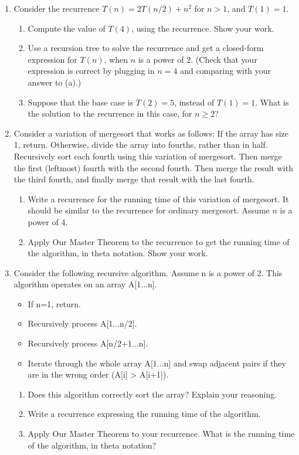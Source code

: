 \documentclass{article}
\begin{document}
\begin{enumerate}
    \item Consider the recurrence $T(n) = 2T(n/2) + n^2$ for $n > 1$, and $T(1) = 1$.
    \begin{enumerate}
        \item Compute the value of $T(4)$, using the recurrence. Show your work.
        \item Use a recursion tree to solve the recurrence and get a closed-form expression for $T(n)$, when $n$ is a power of 2. (Check that your expression is correct by plugging in $n = 4$ and comparing with your answer to (a).)
        \item Suppose that the base case is $T(2) = 5$, instead of $T(1) = 1$. What is the solution to the recurrence in this case, for $n \ge 2$?
    \end{enumerate}

    \item Consider a variation of mergesort that works as follows: If the array has size 1, return. Otherwise, divide the array into fourths, rather than in half. Recursively sort each fourth using this variation of mergesort. Then merge the first (leftmost) fourth with the second fourth. Then merge the result with the third fourth, and finally merge that result with the last fourth.
    \begin{enumerate}
        \item Write a recurrence for the running time of this variation of mergesort. It should be similar to the recurrence for ordinary mergesort. Assume $n$ is a power of 4.
        \item Apply Our Master Theorem to the recurrence to get the running time of the algorithm, in theta notation. Show your work.
    \end{enumerate}

    \item Consider the following recursive algorithm. Assume n is a power of 2.  This algorithm operates on an array A[1...n].
    \begin{itemize}
        \item If n=1, return.
        \item Recursively process A[1...n/2].
        \item Recursively process A[n/2+1...n].
        \item Iterate through the whole array A[1...n] and swap adjacent pairs if they are in the wrong order (A[i] > A[i+1]).
    \end{itemize}
    \begin{enumerate}
        \item  Does this algorithm correctly sort the array? Explain your reasoning.
        \item Write a recurrence expressing the running time of the algorithm.
        \item Apply Our Master Theorem to your recurrence. What is the running time of the algorithm, in theta notation?
    \end{enumerate}



\end{enumerate}
\end{document}
